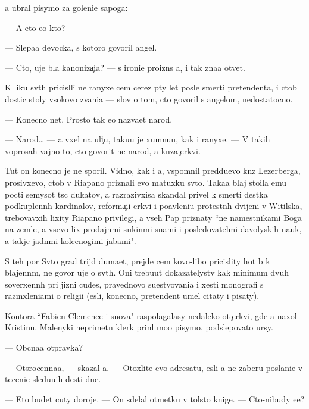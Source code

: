 \documentclass[10pt]{book}
\begin{document}
{\Y}a ubral pisymo za goleni{\x}e sapoga:

— A eto {\y}e{\x}o kto?

— Slepa{\y}a devocka, s kotoro{\y} govoril angel.

— Cto, uje b{\yi}la kanoniza{\c}i{\y}a? — s ironi{\y}e{\y} proizn{\e}s {\y}a, i tak zna{\y}a otvet.

K liku sv{\ia}t{\yi}h pricisl{\ia}li ne ranyxe cem cerez p{\ia}ty let posle smerti pretendenta, i ctob{\yi} dostic stoly v{\yi}sokovo zvani{\y}a — slov o tom, cto govoril s angelom, nedostatocno.

— Konecno net. Prosto tak {\y}e{\y}o naz{\yi}va{\y}et narod.

— Narod… — {\Y}a v{\yi}xel na uli{\c}u, taku{\y}u je xumnu{\y}u, kak i ranyxe. — V takih voprosah vajno to, cto govorit ne narod, a kn{\ia}z{\y}a {\c}erkvi.

Tut on konecno je ne sporil. Vidno, kak i {\y}a, vspomnil pred{\yi}du{\x}evo kn{\ia}z{\ia} Lezerberga, prosivxevo, ctob{\yi} v Riapano priznali {\y}evo matuxku sv{\ia}to{\y}. Taka{\y}a blaj sto{\y}ila {\y}emu pocti semysot t{\yi}s{\ia}c dukatov, a razrazivxi{\y}sa skandal privel k smerti des{\ia}tka podkuplenn{\yi}h kardinalov, reforma{\c}i{\y}i {\C}erkvi i po{\y}avleni{\y}u protestn{\yi}h dvijeni{\y} v Witilska, trebovavxih lixity Riapano privilegi{\y}, a vseh Pap priznaty ``ne namestnikami Boga na zemle, a vsevo lix prodajn{\yi}mi sukin{\yi}mi s{\yi}nami i posledovatel{\ia}mi d{\y}avolyskih nauk, a takje jadn{\yi}mi kolcenogimi jabami".

S teh por Sv{\ia}to{\y} grad trijd{\yi} duma{\y}et, prejde cem kovo-libo pricislity hot{\ia} b{\yi} k blajenn{\yi}m, ne govor{\ia} uje o sv{\ia}t{\yi}h. Oni trebu{\y}ut dokazatelystv kak minimum dvuh soverxenn{\yi}h pri jizni cudes, pravednovo su{\x}estvovani{\y}a i xesti monografi{\y} s razm{\yi}xleni{\y}ami o religi{\y}i ({\y}esli, konecno, pretendent umel citaty i pisaty).

Kontora ``Fabien Clemence i s{\yi}nov{\y}a" raspolagalasy nedaleko ot {\c}erkvi, gde {\y}a naxol Kristinu. Malenyki{\y} neprimetn{\yi}{\y} klerk prin{\ia}l mo{\y}o pisymo, podslepovato {\x}ur{\ia}sy.

— Ob{\yi}cna{\y}a otpravka?

— Otsrocenna{\y}a, — skazal {\y}a. — Otoxlite {\y}evo adresatu, {\y}esli {\y}a ne zaberu poslani{\y}e v teceni{\y}e sledu{\y}u{\x}ih des{\ia}ti dne{\y}.

— Eto budet cuty doroje. — On sdelal otmetku v tolsto{\y} knige. — Cto-nibudy {\y}e{\x}e?
\end{document}
